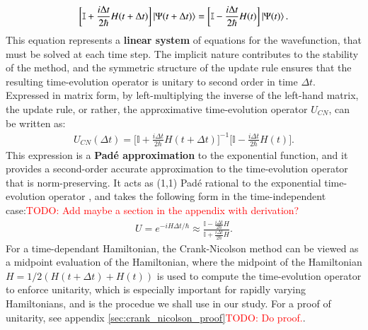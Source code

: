 \documentclass{subfiles}
\begin{document}
\begin{align*}
    \bigg[\mathbb{I} + \frac{i\Delta t}{2\hbar}H(t + \Delta t)\bigg]\ket{\Psi(t + \Delta t)} = \bigg[\mathbb{I} - \frac{i\Delta t}{2\hbar}H(t)\bigg]\ket{\Psi(t)}.
\end{align*}
This equation represents a \textbf{linear system} of equations for the wavefunction, that must be solved at each time step. The implicit nature contributes to the stability of the method, and the symmetric structure of the update rule ensures that the resulting time-evolution operator is unitary to second order in time $\Delta t$. Expressed in matrix form, by left-multiplying the inverse of the left-hand matrix, the update rule, or rather, the approximative time-evolution operator $U_{CN}$, can be written as:
\begin{align*}
    U_{CN} (\Delta t) = \bigg[\mathbb{I} + \frac{i\Delta t}{2\hbar}H(t + \Delta t)\bigg]^{-1}\bigg[\mathbb{I} - \frac{i\Delta t}{2\hbar}H(t)\bigg].
\end{align*}
This expression is a \textbf{Padé approximation} to the exponential function, and it provides a second-order accurate approximation to the time-evolution operator that is norm-preserving. It acts as (1,1) Padé rational to the exponential time-evolution operator \cite{moler2003nineteen, higham2008functions}, and takes the following form in the time-independent case:\textcolor{red}{TODO: Add maybe a section in the appendix with derivation? }
\begin{align*}
    U = e^{-iH\Delta t/\hbar} \approx \frac{\mathbb{I} - \frac{i\Delta t}{2\hbar}H}{\mathbb{I} + \frac{i\Delta t}{2\hbar}H}.
\end{align*}
For a time-dependant Hamiltonian, the Crank-Nicolson method can be viewed as a midpoint evaluation of the Hamiltonian, where the midpoint of the Hamiltonian $H = 1/2(H(t+\Delta t) + H(t))$ is used to compute the time-evolution operator to enforce unitarity, which is especially important for rapidly varying Hamiltonians, and is the procedue we shall use in our study. For a proof of unitarity, see appendix \ref{sec:crank_nicolson_proof}\textcolor{red}{TODO: Do proof.}.
\end{document}
